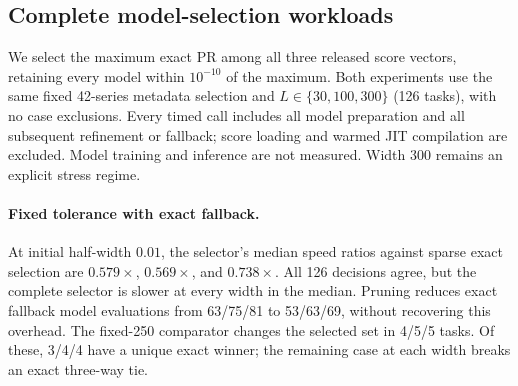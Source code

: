 \subsection{Complete model-selection workloads}
We select the maximum exact PR among all three released score vectors,
retaining every model within $10^{-10}$ of the maximum.
Both experiments use the same fixed 42-series metadata selection and
$L\in\{30,100,300\}$ (126 tasks), with no case exclusions.
Every timed call includes all model preparation and all subsequent
refinement or fallback; score loading and warmed JIT compilation are
excluded. Model training and inference are not measured.
Width 300 remains an explicit stress regime.
\paragraph{Fixed tolerance with exact fallback.}
At initial half-width $0.01$, the selector's median speed ratios
against sparse exact selection are
$0.579\times$, $0.569\times$, and $0.738\times$.
All 126 decisions agree, but the complete selector is slower at every
width in the median. Pruning reduces exact fallback model evaluations
from 63/75/81 to 53/63/69, without recovering this overhead.
The fixed-250 comparator changes the selected set in 4/5/5 tasks.
Of these, 3/4/4 have a unique exact winner; the remaining
case at each width breaks an exact three-way tie.
